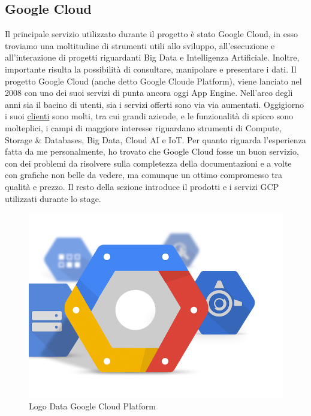 \subsection{Google Cloud}
Il principale servizio utilizzato durante il progetto è stato Google Cloud, in esso troviamo una moltitudine di strumenti utili allo sviluppo, all'esecuzione e all'interazione di progetti riguardanti Big Data e Intelligenza Artificiale. Inoltre, importante risulta la possibilità di consultare, manipolare e presentare i dati.
Il progetto Google Cloud (anche detto Google Cloude Platform), viene lanciato nel 2008 con uno dei suoi servizi di punta ancora oggi \gls{App Engine}. Nell'arco degli anni sia il bacino di utenti, sia i servizi offerti sono via via aumentati. Oggigiorno i suoi \href{https://cloud.google.com/customers/#/}{clienti} sono molti, tra cui grandi aziende, e le funzionalità di spicco sono molteplici, i campi di maggiore interesse riguardano strumenti di Compute, Storage \& Databases, Big Data, Cloud AI e IoT.
Per quanto riguarda l'esperienza fatta da me personalmente, ho trovato che Google Cloud fosse un buon servizio, con dei problemi da risolvere sulla completezza della documentazioni e a volte con grafiche non belle da vedere, ma comunque un ottimo compromesso tra qualità e prezzo.
Il resto della sezione introduce il prodotti e i servizi GCP utilizzati durante lo stage.
\begin{figure}
	\centering
	\includegraphics[scale=0.3]{figures/google-cloud-platform}
	\caption[Short figure name.]{Logo Data Google Cloud Platform
		\label{fig:logoGCP}}
\end{figure}	
